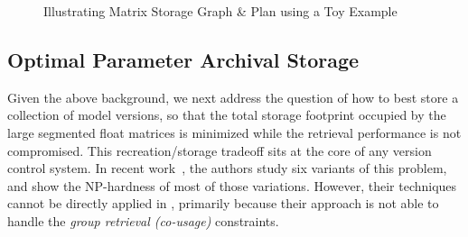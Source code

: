 \documentclass[conference]{IEEEtran}
\begin{document}


\begin{figure}[!t]
\caption{Illustrating Matrix Storage Graph \& Plan using a Toy Example}
\label{fig:optimal_archival_storage_exp}
\end{figure}

\subsection{Optimal Parameter Archival Storage}
\label{subsec:pas_version}

Given the above background, we next address the question of how to best store a collection of model versions, so that the total storage footprint occupied by the large segmented float matrices is minimized while the retrieval performance is not compromised. This recreation/storage tradeoff sits at the core of any version control system. In recent work~\cite{vldb15versioning}, the authors study six variants of this problem, and show the NP-hardness of most of those variations. %
However, their techniques cannot be directly applied in \weightstore, primarily because their approach is not able to handle the {\em group retrieval (co-usage)} constraints.
\end{document}
